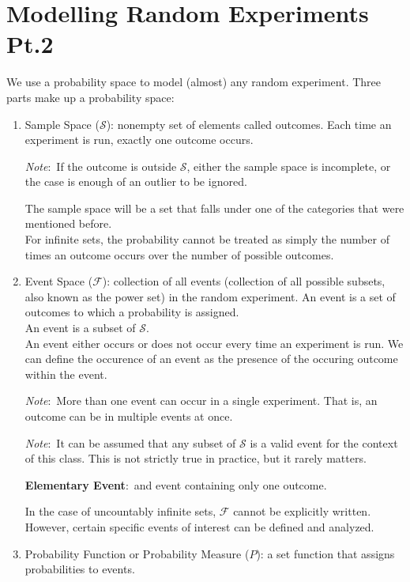 \documentclass[nobib]{tufte-handout}
\newcommand{\defn}[2]{
        \begin{defbox}
        \noindent\textbf{#1}:\ #2
        \end{defbox}
}
\newcommand{\note}[1]{
        \begin{notebox}
        \noindent\textit{Note}:\ #1
        \end{notebox}
}
\newcommand{\sidenoteclass}[1]{
        \begin{sidenotebox}
        \noindent\textit{Sidenote}:\ #1
        \end{sidenotebox}
}
\begin{document}
\section{Modelling Random Experiments Pt.2}
We use a probability space to model (almost) any random experiment. Three parts
make up a probability space:
\begin{enumerate}
    \item Sample Space ($\mathcal{S}$): nonempty set of elements called outcomes. Each
          time an experiment is run, exactly one outcome occurs. \note{If the outcome is
              outside $\mathcal{S}$, either the sample space is incomplete, or the case is
              enough of an outlier to be ignored.} The sample space will be a set that falls
          under one of the categories that were mentioned before.\\ For infinite sets,
          the probability cannot be treated as simply the number of times an outcome
          occurs over the number of possible outcomes.
    \item Event Space ($\mathcal{F}$): collection of all events (collection of all possible subsets, also known as the power set) in the random experiment.
          An event is a set of outcomes to which a probability is assigned.\\ An event is
          a subset of $\mathcal{S}$.\\ An event either occurs or does not occur every time an experiment is run. We can define the occurence of an event as the presence of the occuring outcome within the event.
          \note{More than one event can occur in a single experiment. That is, an outcome can be in multiple events at once.}
          \note{It can be assumed that any subset of $\mathcal{S}$ is a valid event for the context of this class. This is not strictly true in practice, but it rarely matters.}
          \defn{Elementary Event}{and event containing only one outcome.}
          In the case of uncountably infinite sets, $\mathcal{F}$ cannot be explicitly written. However, certain specific events of interest can be defined and analyzed.
    \item Probability Function or Probability Measure ($\mathit{P}$): a set function that assigns probabilities to events.

\end{enumerate}
\end{document}
